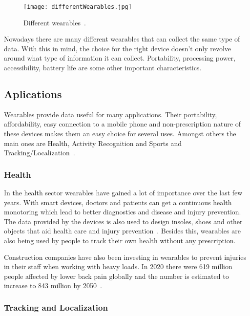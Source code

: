 \begin{figure}[htbp]
    \centering
    \texttt{[image: differentWearables.jpg]}
    \caption{Different wearables~\cite{wearablesAndIOT}.}
    \label{fig:difWearables}
\end{figure}

Nowadays there are many different wearables that can collect the same type of data. With this in mind, the choice for the right device doesn't only revolve around what type of information 
it can collect. Portability, processing power, accessibility, battery life are some other important characteristics.


\subsection{Aplications}
\label{sub:aplications}

Wearables provide data useful for many applications. Their portability, affordability, easy connection to a mobile phone and non-prescription nature of these devices
 makes them an easy choice for several uses. Amongst others the main ones are Health, Activity Recognition and Sports and Tracking/Localization~\cite{wearablesAndIOT}. 

\subsubsection{Health}
\label{ssub:health}

In the health sector wearables have gained a lot of importance over the last few years. With smart devices, doctors and patients can get a continuous health monotoring which lead to better diagnostics and disease and injury prevention. 
The data provided by the devices is also used to design insoles, shoes and other objects that aid health care and injury prevention~\cite{injuryWalking}.
Besides this, wearables are also being used by people to track their own health without any prescription. 

Construction companies have also been investing in wearables to prevent injuries in their staff when working with heavy loads. In 2020 there were 619 million people affected by lower 
back pain globally and the number is estimated to increase to 843 million by 2050~\cite{lowerBack}.


\subsubsection{Tracking and Localization}
\label{ssub:trackingAndLocalization}

